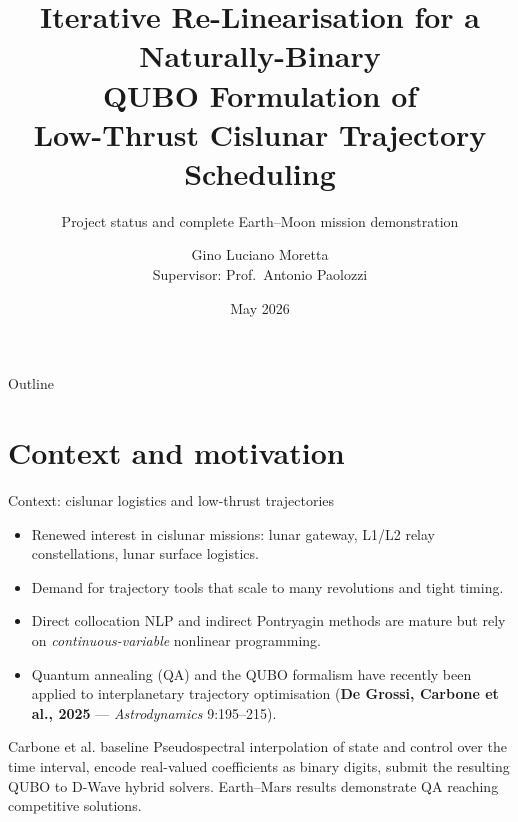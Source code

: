 \documentclass[10pt,aspectratio=169]{beamer}
\title[Iterative Re-Linearisation Binary QUBO]
{Iterative Re-Linearisation for a Naturally-Binary\\
QUBO Formulation of\\
Low-Thrust Cislunar Trajectory Scheduling}
\subtitle{Project status and complete Earth--Moon mission demonstration}
\author[Moretta]{Gino Luciano Moretta\\
\small Supervisor: Prof.~Antonio Paolozzi}
\institute[Sapienza]{School of Aerospace Engineering\\
Sapienza Universit\`a di Roma}
\date{May 2026}
\begin{document}
\begin{frame}[plain]
\titlepage
\end{frame}

\begin{frame}{Outline}
\tableofcontents
\end{frame}

\section{Context and motivation}

\begin{frame}{Context: cislunar logistics and low-thrust trajectories}
\begin{itemize}[itemsep=4pt]
  \item Renewed interest in cislunar missions: lunar gateway, L1/L2
    relay constellations, lunar surface logistics.
  \item Demand for trajectory tools that scale to many revolutions
    and tight timing.
  \item Direct collocation NLP and indirect Pontryagin methods are
    mature but rely on \emph{continuous-variable} nonlinear
    programming.
  \item Quantum annealing (QA) and the QUBO formalism have recently
    been applied to interplanetary trajectory optimisation
    (\textbf{De Grossi, Carbone et al., 2025} ---
    \emph{Astrodynamics} 9:195--215).
\end{itemize}

\vspace{0.3em}
\begin{block}{Carbone et al. baseline}
Pseudospectral interpolation of state and control over the time
interval, encode real-valued coefficients as binary digits, submit
the resulting QUBO to D-Wave hybrid solvers. Earth--Mars results
demonstrate QA reaching competitive solutions.
\end{block}
\end{frame}
\end{document}
